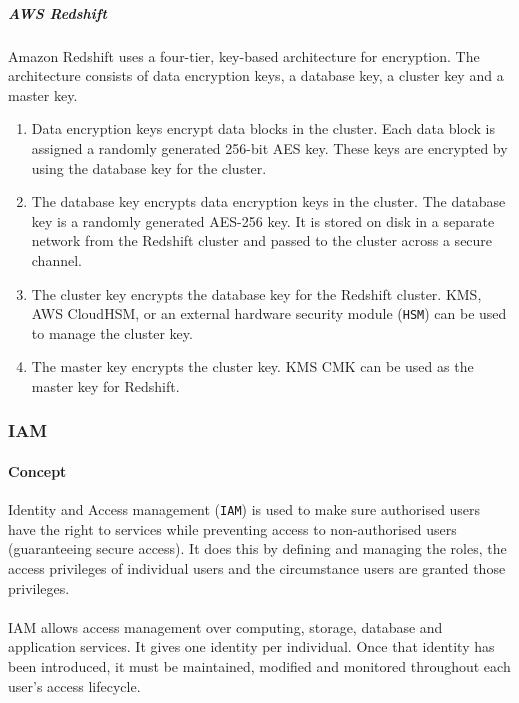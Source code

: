 \documentclass[10pt]{article}
\begin{document}
\subparagraph{AWS Redshift}
Amazon Redshift uses a four-tier, key-based architecture for encryption. The architecture consists of data encryption keys, a database key, a cluster key and a master key.
\\
\begin{enumerate}
	\item Data encryption keys encrypt data blocks in the cluster. Each data block is assigned a randomly generated 256-bit AES key. These keys are encrypted by using the database key for the cluster.
	\item The database key encrypts data encryption keys in the cluster. The database key is a randomly generated AES-256 key. It is stored on disk in a separate network from the Redshift cluster and passed to the cluster across a secure channel.
	\item The cluster key encrypts the database key for the Redshift cluster.  KMS, AWS CloudHSM, or an external hardware security module (\texttt{HSM}) can be used to manage the cluster key.
	\item The master key encrypts the cluster key. KMS CMK can be used as the master key for Redshift.
\end{enumerate}





\newpage

\subsubsection{IAM}
\paragraph{Concept}
Identity and Access management (\texttt{IAM}) is used to make sure authorised users have the right to services while preventing access to non-authorised users (guaranteeing secure access). It does this by defining and managing the roles, the access privileges of individual users and the circumstance users are granted those privileges.
\\ \\
IAM allows access management over computing, storage, database and application services. It gives one identity per individual. Once that identity has been introduced, it must be maintained, modified and monitored throughout each user’s access lifecycle. \cite{iam}
\end{document}
